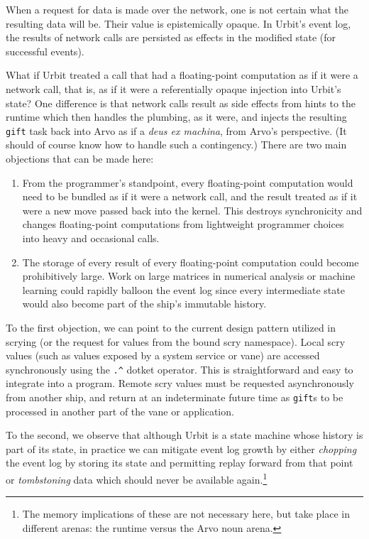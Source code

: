 \documentclass[twoside]{article}
\begin{document}
When a request for data is made over the network, one is not certain what the resulting data will be.  Their value is epistemically opaque.  In Urbit's event log, the results of network calls are persisted as effects in the modified state (for successful events).

What if Urbit treated a call that had a floating-point computation as if it were a network call, that is, as if it were a referentially opaque injection into Urbit's state?  One difference is that network calls result as side effects from hints to the runtime which then handles the plumbing, as it were, and injects the resulting \texttt{gift} task back into Arvo as if a \emph{deus ex machina}, from Arvo's perspective.  (It should of course know how to handle such a contingency.)  There are two main objections that can be made here:

\begin{enumerate}
  \item  From the programmer's standpoint, every floating-point computation would need to be bundled as if it were a network call, and the result treated as if it were a new move passed back into the kernel.  This destroys synchronicity and changes floating-point computations from lightweight programmer choices into heavy and occasional calls.

  \item  The storage of every result of every floating-point computation could become prohibitively large.  Work on large matrices in numerical analysis or machine learning could rapidly balloon the event log since every intermediate state would also become part of the ship's immutable history.
\end{enumerate}

To the first objection, we can point to the current design pattern utilized in scrying (or the request for values from the bound scry namespace).  Local scry values (such as values exposed by a system service or vane) are accessed synchronously using the \lstinline[style=inlinecode]{.^} dotket operator.  This is straightforward and easy to integrate into a program.  Remote scry values must be requested asynchronously from another ship, and return at an indeterminate future time as \lstinline[style=inlinecode]{gift}s to be processed in another part of the vane or application.

To the second, we observe that although Urbit is a state machine whose history is part of its state, in practice we can mitigate event log growth by either \emph{chopping} the event log by storing its state and permitting replay forward from that point or \emph{tombstoning} data which should never be available again.\footnote{The memory implications of these are not necessary here, but take place in different arenas:  the runtime versus the Arvo noun arena.}
\end{document}
